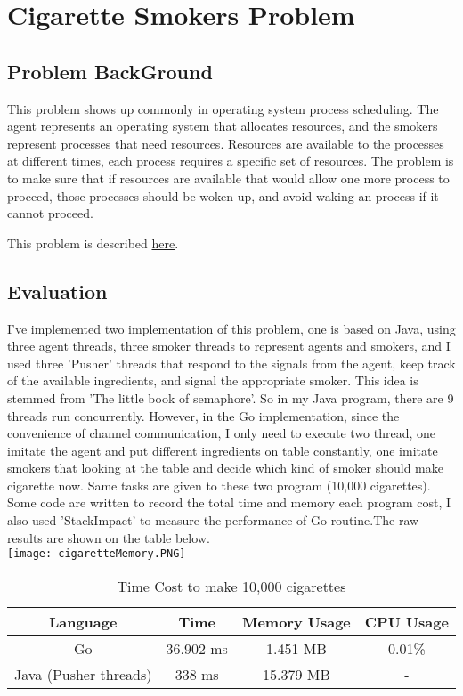 \documentclass[a4paper,10pt]{article}
\begin{document}
\newpage
\section{Cigarette Smokers Problem}
\subsection{Problem BackGround}
This problem shows up commonly in operating system process scheduling. The agent represents an operating system that allocates resources, and the smokers represent processes that need resources. Resources are available to the processes at different times, each process requires a specific set of resources. The problem is to make sure that if resources are available that would allow one more process to proceed, those processes should be woken up, and avoid waking an process if it cannot proceed.


This problem is described \href{http://greenteapress.com/semaphores/LittleBookOfSemaphores.pdf#section.4.5}{here}.

\subsection{Evaluation}
I've implemented two implementation of this problem, one is based on Java, using three agent threads, three smoker threads to represent agents and smokers, and I used three 'Pusher' threads  that respond to the signals from the agent, keep track of the available ingredients, and signal the appropriate smoker. This idea is stemmed from 'The little book of semaphore'. So in my Java program, there are 9 threads run concurrently. However, in the Go implementation, since the convenience of channel communication, I only need to execute two thread, one imitate the agent and put different ingredients on table constantly, one imitate smokers that looking at the table and decide which kind of smoker should make cigarette now.
Same tasks are given to these two program (10,000 cigarettes). Some code are written to record the total time and memory each program cost, I also used 'StackImpact' to measure the performance of Go routine.The raw results are shown on the table below.\\
\texttt{[image: cigaretteMemory.PNG]}\\
\begin{table}[h]
    \centering
    \begin{tabular}{|c|c|c|c|}
    \hline
        \textbf{Language} & \textbf{Time}& \textbf{Memory Usage}& \textbf{CPU Usage}\\\hline
        Go & 36.902 ms & 1.451 MB& 0.01\%\\\hline
        Java (Pusher threads) & 338 ms & 15.379 MB & -\\\hline
    \end{tabular}
    \caption{Time Cost to make 10,000 cigarettes}
\end{table}
\end{document}
